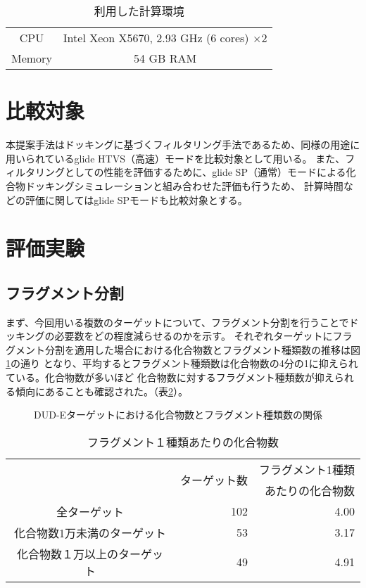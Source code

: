 \begin{table}[htb] \centering
	\caption{利用した計算環境}
	\label{table:computer_node}
	\begin{tabular}{cc}
	\hline
	CPU		&Intel Xeon X5670, 2.93 GHz (6 cores) $\times2$ \\
	Memory	& 54 GB RAM \\ \hline 
	\end{tabular}
\end{table}

\section{比較対象}
本提案手法はドッキングに基づくフィルタリング手法であるため、同様の用途に用いられているglide HTVS（高速）モードを比較対象として用いる。
また、フィルタリングとしての性能を評価するために、glide SP（通常）モードによる化合物ドッキングシミュレーションと組み合わせた評価も行うため、
計算時間などの評価に関してはglide SPモードも比較対象とする。

\section{評価実験}

\subsection{フラグメント分割}\label{subsec:result_decomposition}
まず、今回用いる複数のターゲットについて、フラグメント分割を行うことでドッキングの必要数をどの程度減らせるのかを示す。
それぞれターゲットにフラグメント分割を適用した場合における化合物数とフラグメント種類数の推移は図\ref{fig:dude_decomposition}の通り
となり、平均するとフラグメント種類数は化合物数の4分の1に抑えられている。化合物数が多いほど
化合物数に対するフラグメント種類数が抑えられる傾向にあることも確認された。（表\ref{table:dude_decomposition}）。

\begin{figure}[htp]
 \begin{center}
  \caption{DUD-Eターゲットにおける化合物数とフラグメント種類数の関係}
  \label{fig:dude_decomposition}
 \end{center}
\end{figure}
\begin{table}[htb] \centering
	\caption{フラグメント１種類あたりの化合物数}
	\label{table:dude_decomposition}
	\begin{tabular}{c|rr}
	\hline
								&\multirow{2}{*}{ターゲット数}	&フラグメント1種類		\\
								&						&あたりの化合物数		\\ \hline
	全ターゲット					&102		&4.00							\\
	化合物数1万未満のターゲット		&53			&3.17							\\
	化合物数１万以上のターゲット	&49			&4.91							\\ \hline
	\end{tabular}
\end{table}


